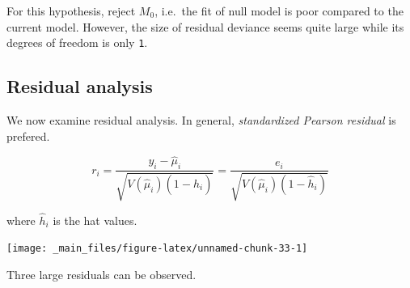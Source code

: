 \documentclass[]{book}
\newenvironment{Shaded}{\begin{snugshade}}{\end{snugshade}}
\newcommand{\DataTypeTok}[1]{\textcolor[rgb]{0.13,0.29,0.53}{#1}}
\newcommand{\FloatTok}[1]{\textcolor[rgb]{0.00,0.00,0.81}{#1}}
\newcommand{\KeywordTok}[1]{\textcolor[rgb]{0.13,0.29,0.53}{\textbf{#1}}}
\newcommand{\NormalTok}[1]{#1}
\newcommand{\OperatorTok}[1]{\textcolor[rgb]{0.81,0.36,0.00}{\textbf{#1}}}
\newcommand{\StringTok}[1]{\textcolor[rgb]{0.31,0.60,0.02}{#1}}
\begin{document}
For this hypothesis, reject \(M_0\), i.e.~the fit of null model is poor compared to the current model. However, the size of residual deviance seems quite large while its degrees of freedom is only \texttt{1}.

\hypertarget{residual-analysis}{%
\subsection{Residual analysis}\label{residual-analysis}}

We now examine residual analysis. In general, \emph{standardized Pearson residual} is prefered.

\[r_i = \frac{y_i - \hat\mu_i}{\sqrt{V(\hat\mu_i)(1 - \hat{h}_i)}} = \frac{e_i}{\sqrt{V(\hat\mu_i)(1 - \hat{h}_i)}}\]

where \(\hat{h}_i\) is the hat values.

\begin{Shaded}
\end{Shaded}

\begin{center}\texttt{[image: \_main\_files/figure-latex/unnamed-chunk-33-1]} \end{center}

Three large residuals can be observed.

\begin{Shaded}
\end{Shaded}
\end{document}
